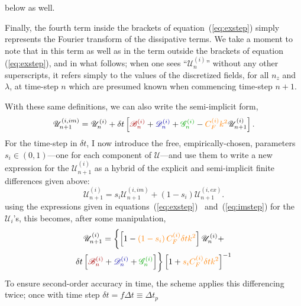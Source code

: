 \documentclass[12pt]{memoir}
\newcommand{\bfield}{\mathscr{B}}
\newcommand{\dfield}{\mathscr{D}}
\newcommand{\gfield}{\mathscr{G}}
\newcommand{\ufield}{\mathscr{U}}
\begin{document}
below as well. 
%
\par
%
Finally, the fourth term inside the brackets of equation~(\ref{eq:exstep})
simply represents the Fourier transform of the dissipative terms. We take a
moment to note that in this term as well as in the term outside the brackets
of equation (\ref{eq:exstep}), and in what follows; when one sees
``$\ufield^{(i)}_n$'' without any other superscripts, it refers simply to 
the values of the discretized fields, for all $n_z$ and $\lambda$, at 
time-step $n$ which are presumed known when commencing time-step $n+1$.
%
\par
%
With these same definitions, we can also write the semi-implicit form,
%
\begin{equation}
  \ufield_{n+1}^{(i,im)} = \ufield^{(i)}_n
  + \delta t\left[
                    {\color{red!65!black}  \bfield^{(i)}_n}
                  + {\color{blue!65!black} \dfield^{(i)}_n}
                  + {\color{green!65!black}\gfield^{(i)}_n}
                  - {\color{orange}C^{(i)}_F k^2}
                  \ufield^{(i)}_{n+1}
           \right].
  \label{eq:imstep}
\end{equation}
%
For the time-step in $\delta t$, I now introduce the free,
empirically-chosen, parameters $s_i\in (0,1)$---one for
each component of $\ufield$---and use them to write a new
expression for the $\ufield^{(i)}_{n+1}$ as a hybrid of the
explicit and semi-implicit finite differences given above:
%
\begin{equation}
  \ufield^{(i)}_{n+1} = s_i\ufield^{(i,im)}_{n+1} + (1-s_i)\ufield^{(i,ex)}_{n+1}.
\end{equation}
%
using the expressions given in equations~(\ref{eq:exstep})~
and~(\ref{eq:imstep}) for the $\ufield_i$'s, this becomes,
after some manipulation,
%
\begin{multline}
  \ufield^{(i)}_{n+1} = \biggl\{
%
   \left[
            1 
            - {\color{orange}\left(1-s_i\right)C^{(i)}_F\delta t k^2}
  \right] 
%
  \ufield^{(i)}_n 
  + \\
  \delta t\left[
                  {\color{red!65!black}  \bfield^{(i)}_n}
                + {\color{blue!65!black} \dfield^{(i)}_n}
                + {\color{green!65!black}\gfield^{(i)}_n}
         \right]
                    \biggr\}
   \left[      1
   + {\color{orange}s_iC^{(i)}_F\delta t k^2}
  \right]^{-1}
\end{multline}
%
To ensure second-order accuracy in time, the scheme applies this
differencing twice; once with time step $\delta t = f\Delta t\equiv\Delta t_p$ 
\end{document}
